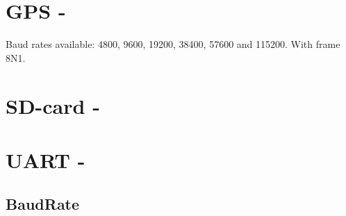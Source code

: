 \section{GPS - \GPS}
Baud rates available: \num{4800}, \num{9600}, \num{19200}, \num{38400}, \num{57600} and \num{115200}. With frame 8N1.

\cite{MKRSchem}

\section{SD-card - \SDsock}


\section{UART - \SAMD}

\subsection{BaudRate}


\FloatBarrier